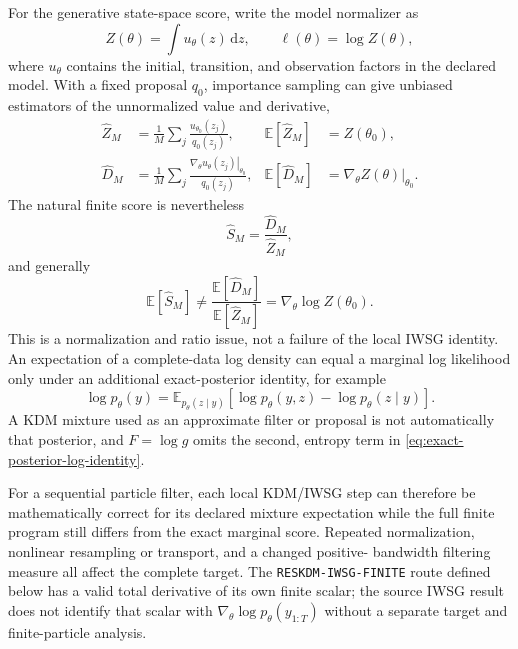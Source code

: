 \documentclass[11pt]{article}
\newcommand{\dd}{\mathrm{d}}
\begin{document}
For the generative state-space score, write the model normalizer as
\begin{equation}
 Z(\theta)=\int u_\theta(z)\,\dd z,
 \qquad
 \ell(\theta)=\log Z(\theta),
 \label{eq:iwsg-generative-normalizer}
\end{equation}
where $u_\theta$ contains the initial, transition, and observation factors
in the declared model. With a fixed proposal $q_0$, importance sampling can
give unbiased estimators of the unnormalized value and derivative,
\begin{align}
 \widehat Z_M
 &=\frac1M\sum_j\frac{u_{\theta_0}(z_j)}{q_0(z_j)},
 &\mathbb E[\widehat Z_M]&=Z(\theta_0),\nonumber\\
 \widehat D_M
 &=\frac1M\sum_j\frac{\left.\nabla_\theta u_\theta(z_j)\right|_{\theta_0}}{q_0(z_j)},
 &\mathbb E[\widehat D_M]&=\left.\nabla_\theta Z(\theta)\right|_{\theta_0}.
 \label{eq:iwsg-unnormalized-pair}
\end{align}
The natural finite score is nevertheless
\begin{equation}
 \widehat S_M=\frac{\widehat D_M}{\widehat Z_M},
 \label{eq:iwsg-ratio-score}
\end{equation}
and generally
\begin{equation}
 \mathbb E[\widehat S_M]
 \ne
 \frac{\mathbb E[\widehat D_M]}{\mathbb E[\widehat Z_M]}
 =\nabla_\theta\log Z(\theta_0).
 \label{eq:iwsg-ratio-bias}
\end{equation}
This is a normalization and ratio issue, not a failure of the local IWSG
identity. An expectation of a complete-data log density can equal a marginal
log likelihood only under an additional exact-posterior identity, for example
\begin{equation}
 \log p_\theta(y)
 =\mathbb E_{p_\theta(z\mid y)}
   \left[\log p_\theta(y,z)-\log p_\theta(z\mid y)\right].
 \label{eq:exact-posterior-log-identity}
\end{equation}
A KDM mixture used as an approximate filter or proposal is not automatically
that posterior, and $F=\log g$ omits the second, entropy term in
\eqref{eq:exact-posterior-log-identity}.

For a sequential particle filter, each local KDM/IWSG step can therefore be
mathematically correct for its declared mixture expectation while the full
finite program still differs from the exact marginal score. Repeated
normalization, nonlinear resampling or transport, and a changed positive-
bandwidth filtering measure all affect the complete target. The
\texttt{RESKDM-IWSG-FINITE} route defined below has a valid total derivative
of its own finite scalar; the source IWSG result does not identify that scalar
with $\nabla_\theta\log p_\theta(y_{1:T})$ without a separate target and
finite-particle analysis.
\end{document}
